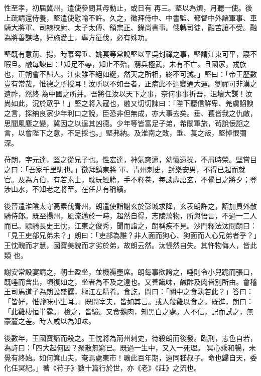 \begin{pinyinscope}
 性至孝，初屆冀州，遣使參問其母動止，或日有
 再三。堅以為煩，月聽一使。後上疏請還侍養，堅遣使慰喻不許。久之，徵拜侍中、中書監、都督中外諸軍事、車騎大將軍、司隸校尉、太子太傅、領宗正、錄尚書事。俄轉司徒，融苦讓不受。融為將善謀略，好施愛士，專方征伐，必有殊功。



 堅既有意荊、揚，時慕容垂、姚萇等常說堅以平吳封禪之事，堅謂江東可平，寢不暇旦。融每諫曰：「知足不辱，知止不殆，窮兵極武，未有不亡。且國家，戎族也，正朔會不歸人。江東雖不絕如綖，然天之所相，終不可滅。」堅曰：「帝王歷數豈有常哉，惟德之所授耳！汝所以不如吾者，正病此不達變通大運。劉禪可非漢之遺祚，然終
 為中國之所并。吾將任汝以天下之事，奈何事事折吾，沮壞大謀！汝尚如此，況於眾乎！」堅之將入寇也，融又切切諫曰：「陛下聽信鮮卑、羌虜諂諛之言，採納良家少年利口之說，臣恐非但無成，亦大事去矣。垂、萇皆我之仇敵，思聞風塵之變，冀因之以逞其凶德。少年等皆富足子弟，希關軍旅，茍說佞諂之言，以會陛下之意，不足採也。」堅弗納。及淮南之敗，垂、萇之叛，堅悼恨彌深。



 苻朗，字元達，堅之從兄子也。性宏達，神氣爽邁，幼懷遠操，不屑時榮。堅嘗目之曰：「吾家千里駒也。」徵拜鎮東將
 軍、青州刺史，封樂安男，不得已起而就官。及為方伯，有若素士，耽玩經籍，手不釋卷，每談虛語玄，不覺日之將夕；登涉山水，不知老之將至。在任甚有稱績。



 後晉遣淮陰太守高素伐青州，朗遣使詣謝玄於彭城求降，玄表朗許之，詔加員外散騎侍郎。既至揚州，風流邁於一時，超然自得，志陵萬物，所與悟言，不過一二人而已。驃騎長史王忱，江東之俊秀，聞而詣之，朗稱疾不見。沙門釋法汰問朗曰：「見王吏部兄弟未？」朗曰：「吏部為誰？非人面而狗心、狗面而人心兄弟者乎？」王忱醜而才慧，國寶美貌而才劣於弟，故朗云然。汰悵然自失。其忤物侮人，皆此類
 也。



 謝安常設宴請之，朝士盈坐，並機褥壺席。朗每事欲誇之，唾則令小兒跪而張口，既唾而含出，頃復如之，坐者為不及之遠也。又善識味，鹹酢及肉皆別所由。會稽王司馬道子為朗設盛饌，極江左精肴。食訖，問曰：「關中之食孰若此？」答曰：「皆好，惟鹽味小生耳。」既問宰夫，皆如其言。或人殺雞以食之，既進，朗曰：「此雞棲恒半露。」檢之，皆驗。又食鵝肉，知黑白之處。人不信，記而試之，無豪釐之差。時人咸以為知味。



 後數年，王國寶譖而殺之。王忱將為荊州刺史，待殺朗而後發。臨刑，志色自若，為詩曰：「四大起何因？聚散無窮已。既過一生中，又入一死理。
 冥心乘和暢，未覺有終始。如何箕山夫，奄焉處東市！曠此百年期，遠同嵇叔子。命也歸自天，委化任冥紀。」著《苻子》數十篇行於世，亦《老》《莊》之流也。



\end{pinyinscope}